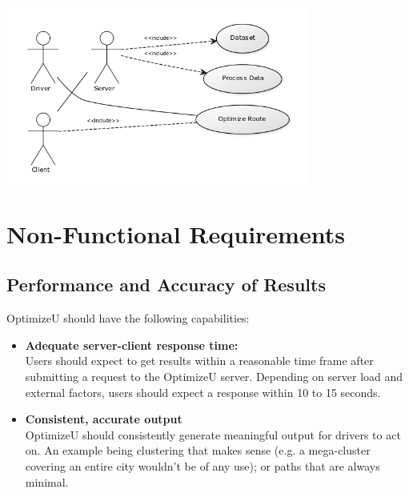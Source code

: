 \documentclass[12pt]{article}
\begin{document}
\includegraphics[width=100mm,scale=0.9]{Uses.png}


\section{Non-Functional Requirements}
\subsection{Performance and Accuracy of Results}
OptimizeU should have the following capabilities:
\begin{itemize}
	\item \textbf{Adequate server-client response time:}\\
		Users should expect to get results within a reasonable time frame after submitting
		a request to the OptimizeU server. Depending on server load and external factors,
		users should expect a response within 10 to 15 seconds.
	\item \textbf{Consistent, accurate output}\\
		OptimizeU should consistently generate meaningful output for drivers to act on.
		An example being clustering that makes sense (e.g. a mega-cluster covering an 
		entire city wouldn't be of any use); or paths that are always minimal.
\end{itemize}
\end{document}
